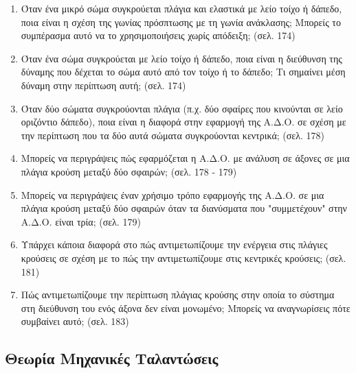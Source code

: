 \documentclass{article}
\begin{document}
\begin{enumerate}
      \item
            Όταν ένα μικρό σώμα συγκρούεται πλάγια και ελαστικά με λείο τοίχο ή δάπεδο, ποια είναι η σχέση της γωνίας πρόσπτωσης με τη γωνία ανάκλασης; Μπορείς το συμπέρασμα αυτό να το χρησιμοποιήσεις χωρίς απόδειξη; (σελ. 174)

      \item
            Όταν ένα σώμα συγκρούεται με λείο τοίχο ή δάπεδο, ποια είναι η διεύθυνση της δύναμης που δέχεται το σώμα αυτό από τον τοίχο ή το δάπεδο; Τι σημαίνει μέση δύναμη στην περίπτωση αυτή; (σελ. 174)

      \item
            Όταν δύο σώματα συγκρούονται πλάγια (π.χ. δύο σφαίρες που κινούνται σε λείο οριζόντιο δάπεδο), ποια είναι η διαφορά στην εφαρμογή της Α.Δ.Ο. σε σχέση με την περίπτωση που τα δύο αυτά σώματα συγκρούονται κεντρικά; (σελ. 178)

      \item
            Μπορείς να περιγράψεις πώς εφαρμόζεται η Α.Δ.Ο. με ανάλυση σε άξονες σε μια πλάγια κρούση μεταξύ δύο σφαιρών; (σελ. 178 - 179)

      \item
            Μπορείς να περιγράψεις έναν χρήσιμο τρόπο εφαρμογής της Α.Δ.Ο. σε μια πλάγια κρούση μεταξύ δύο σφαιρών όταν τα διανύσματα που "συμμετέχουν" στην Α.Δ.Ο. είναι τρία; (σελ. 179)

      \item
            Υπάρχει κάποια διαφορά στο πώς αντιμετωπίζουμε την ενέργεια στις πλάγιες κρούσεις σε σχέση με το πώς την αντιμετωπίζουμε στις κεντρικές κρούσεις; (σελ. 181)

      \item
            Πώς αντιμετωπίζουμε την περίπτωση πλάγιας κρούσης στην οποία το σύστημα στη διεύθυνση του ενός άξονα δεν είναι μονωμένο; Μπορείς να αναγνωρίσεις πότε συμβαίνει αυτό; (σελ. 183)
\end{enumerate}

\subsection{Θεωρία Μηχανικές Ταλαντώσεις}
\end{document}
